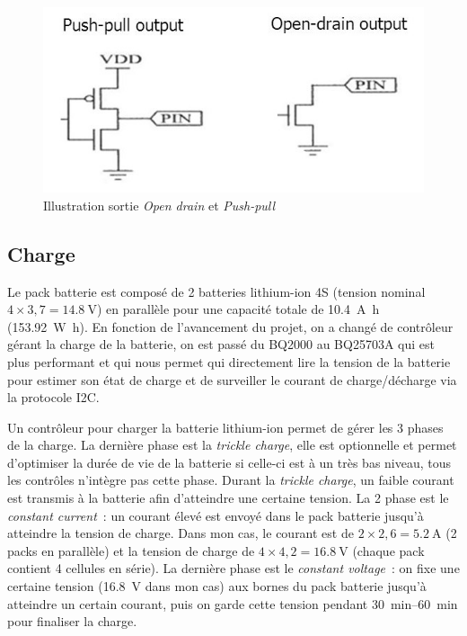 \documentclass[a4paper, 12pt, sffamily]{report}
\begin{document}
\begin{figure}[H]
\centering
\includegraphics[scale=0.55]{figures/screenshots/opendrain_pushpull.png}
\caption{Illustration sortie \emph{Open drain} et \emph{Push-pull}} 
\label{fig:opendrain_pushpull}
\end{figure}

\subsection{Charge}
Le pack batterie est composé de 2 batteries lithium-ion 4S (tension nominal $4\times3,7=\SI{14.8}{\volt}$) en parallèle pour une capacité totale de \SI{10.4}{\ampere\hour} (\SI{153.92}{\watt\hour}). En fonction de l’avancement du projet, on a changé de contrôleur gérant la charge de la batterie, on est passé du BQ2000 au BQ25703A qui est plus performant et qui nous permet qui directement lire la tension de la batterie pour estimer son état de charge et de surveiller le courant de charge/décharge via la protocole I2C.

Un contrôleur pour charger la batterie lithium-ion permet de gérer les 3 phases de la charge. La dernière phase est la \emph{trickle charge}, elle est optionnelle et permet d’optimiser la durée de vie de la batterie si celle-ci est à un très bas niveau, tous les contrôles n’intègre pas cette phase. Durant la \emph{trickle charge}, un faible courant est transmis à la batterie afin d’atteindre une certaine tension. La 2\ieme{} phase est le \emph{constant current}~: un courant élevé est envoyé dans le pack batterie jusqu’à atteindre la tension de charge. Dans mon cas, le courant est de $2\times2,6 = \SI{5.2}{\ampere}$ (2 packs en parallèle) et la tension de charge de $4\times4,2 = \SI{16.8}{\volt}$ (chaque pack contient 4 cellules en série). La dernière phase est le \emph{constant voltage}~: on fixe une certaine tension (\SI{16.8}{\volt} dans mon cas) aux bornes du pack batterie jusqu’à atteindre un certain courant, puis on garde cette tension pendant \SIrange{30}{60}{\minute} pour finaliser la charge.
\end{document}
